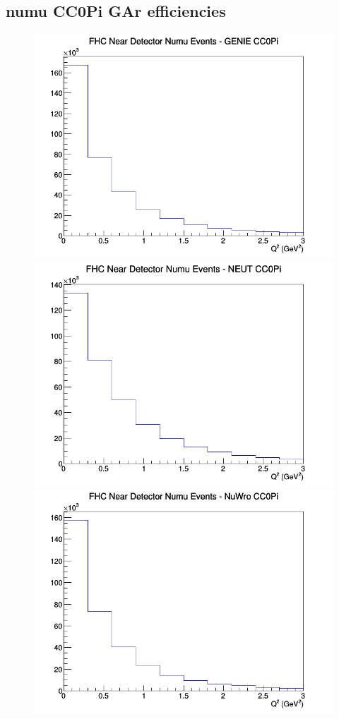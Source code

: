 \documentclass[12pt]{article}
\begin{document}
\subsection{numu CC0Pi GAr efficiencies}
\begin{figure}[h]
\includegraphics[width=\linewidth]{eff_Q2/GAr/CC0Pi_FHC_ND_numu_Q2_GENIE.png}
\endminipage
{}
\includegraphics[width=\linewidth]{eff_Q2/GAr/CC0Pi_FHC_ND_numu_Q2_NEUT.png}
\endminipage
{}
\includegraphics[width=\linewidth]{eff_Q2/GAr/CC0Pi_FHC_ND_numu_Q2_NuWro.png}

\end{figure}
\end{document}

